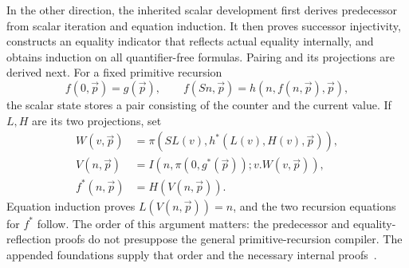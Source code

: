 \documentclass[11pt,letterpaper]{article}
\theoremstyle{definition}\newtheorem{definition}[theorem]{Definition}
\theoremstyle{remark}\newtheorem{remark}[theorem]{Remark}
\begin{document}
In the other direction, the inherited scalar development first derives
predecessor from scalar iteration and equation induction. It then proves
successor injectivity, constructs an equality indicator that reflects
actual equality internally, and obtains induction on all quantifier-free
formulas. Pairing and its projections are derived next. For a fixed
primitive recursion
\[
 f(0,\vec p)=g(\vec p),\qquad
 f(Sn,\vec p)=h(n,f(n,\vec p),\vec p),
\]
the scalar state stores a pair consisting of the counter and the current
value. If $L,H$ are its two projections, set
\[
\begin{aligned}
 W(v,\vec p)&=\pi(SL(v),h^*(L(v),H(v),\vec p)),\\
 V(n,\vec p)&=I(n,\pi(0,g^*(\vec p));v.W(v,\vec p)),\\
 f^*(n,\vec p)&=H(V(n,\vec p)).
\end{aligned}
\]
Equation induction proves $L(V(n,\vec p))=n$, and the two recursion
equations for $f^*$ follow. The order of this argument matters: the
predecessor and equality-reflection proofs do not presuppose the general
primitive-recursion compiler. The appended foundations supply that order
and the necessary internal proofs~\cite{choice,bridge,erasure,forward,progress}.
\end{document}
